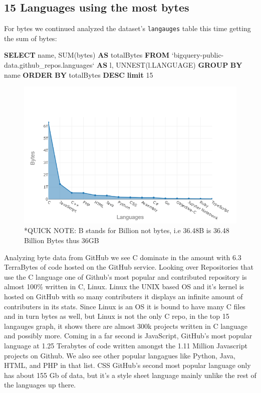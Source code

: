\documentclass[11pt]{article}
\makeatletter
\def\maxwidth{\ifdim\Gin@nat@width>\linewidth\linewidth
    \else\Gin@nat@width\fi}
\let\Oldincludegraphics\includegraphics
\renewcommand{\includegraphics}[1]{\Oldincludegraphics[width=.8\maxwidth]{#1}}
\newenvironment{Shaded}{}{}
\newcommand{\KeywordTok}[1]{\textcolor[rgb]{0.00,0.44,0.13}{\textbf{{#1}}}}
\newcommand{\DecValTok}[1]{\textcolor[rgb]{0.25,0.63,0.44}{{#1}}}
\newcommand{\FunctionTok}[1]{\textcolor[rgb]{0.02,0.16,0.49}{{#1}}}
\newcommand{\NormalTok}[1]{{#1}}
\makeatother
\begin{document}
    \subsection{15 Languages using the most
bytes}\label{languages-using-the-most-bytes}

    For bytes we continued analyzed the dataset's \texttt{langauges} table
this time getting the sum of bytes:

\begin{Shaded}
\begin{Highlighting}[]
\KeywordTok{SELECT}
\NormalTok{  name,}
  \FunctionTok{SUM}\NormalTok{(bytes) }\KeywordTok{AS}\NormalTok{ totalBytes}
\KeywordTok{FROM}
\NormalTok{  `bigquery-public-data.github_repos.languages` }\KeywordTok{AS}\NormalTok{ l,}
\NormalTok{  UNNEST(l.LANGUAGE)}
\KeywordTok{GROUP} \KeywordTok{BY}
\NormalTok{  name}
\KeywordTok{ORDER} \KeywordTok{BY}
\NormalTok{  totalBytes }\KeywordTok{DESC}
\KeywordTok{limit} \DecValTok{15}
\end{Highlighting}
\end{Shaded}

\begin{figure}[H]
\centering
\includegraphics{newplot1.png}
\caption{*QUICK NOTE: B stands for Billion not bytes, i.e 36.48B is
36.48 Billion Bytes thus 36GB}
\end{figure}

    Analyzing byte data from GitHub we see C dominate in the amount with 6.3
TerraBytes of code hosted on the GitHub service. Looking over
Repositories that use the C language one of Github's most popular and
contributed repository is almost 100\% written in C, Linux. Linux the
UNIX based OS and it's kernel is hosted on GitHub with so many
contributers it displays an infinite amount of contributers in its
stats. Since Linux is an OS it is bound to have many C files and in turn
bytes as well, but Linux is not the only C repo, in the top 15 langauges
graph, it shows there are almost 300k projects written in C language and
possibly more. Coming in a far second is JavaScript, GitHub's most
popular language at 1.25 Terabytes of code written amongst the 1.11
Million Javascript projects on Github. We also see other popular
langagues like Python, Java, HTML, and PHP in that list. CSS GitHub's
second most popular language only has about 155 Gb of data, but it's a
style sheet language mainly unlike the rest of the languages up there.
\end{document}
